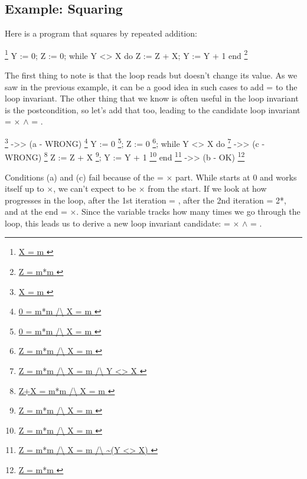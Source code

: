 \documentclass[12pt]{report}
\begin{document}
\subsection{Example: Squaring}



 Here is a program that squares  by repeated addition:


  \footnote{\url{ X = m }}
    Y := 0;
    Z := 0;
    while Y <> X  do
      Z := Z + X;
      Y := Y + 1
    end
  \footnote{\url{ Z = m*m }}


 The first thing to note is that the loop reads  but doesn't
    change its value. As we saw in the previous example, it can be a good idea
    in such cases to add  =  to the loop invariant.  The other thing
    that we know is often useful in the loop invariant is the postcondition,
    so let's add that too, leading to the candidate loop invariant
     =  \ensuremath{\times}  \ensuremath{\land}  = .


    \footnote{\url{ X = m }} ->>                                       (a - WRONG)
    \footnote{\url{ 0 = m*m /\ X = m }}
      Y := 0
                   \footnote{\url{ 0 = m*m /\ X = m }};
      Z := 0
                   \footnote{\url{ Z = m*m /\ X = m }};
      while Y <> X do
                   \footnote{\url{ Z = m*m /\ X = m /\ Y <> X }} ->>   (c - WRONG)
                   \footnote{\url{ Z+X = m*m /\ X = m }}
        Z := Z + X
                   \footnote{\url{ Z = m*m /\ X = m }};
        Y := Y + 1
                   \footnote{\url{ Z = m*m /\ X = m }}
      end
    \footnote{\url{ Z = m*m /\ X = m /\ ~(Y <> X) }} ->>               (b - OK)
    \footnote{\url{ Z = m*m }}


    Conditions (a) and (c) fail because of the  = \ensuremath{\times} part.  While
     starts at 0 and works itself up to \ensuremath{\times}, we can't expect
     to be \ensuremath{\times} from the start.  If we look at how  progresses
    in the loop, after the 1st iteration  = , after the 2nd
    iteration  = 2*, and at the end  = \ensuremath{\times}.  Since the variable
     tracks how many times we go through the loop, this leads us to
    derive a new loop invariant candidate:  = \ensuremath{\times} \ensuremath{\land}  = .
\end{document}
